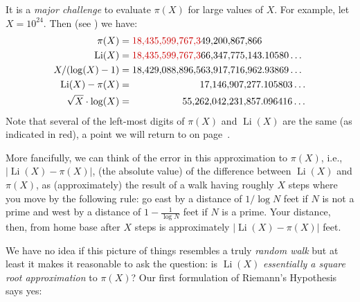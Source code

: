 \documentclass[openany]{book}
\DeclareMathOperator{\Li}{Li}
\theoremstyle{plain}
\theoremstyle{definition}
\begin{document}
It is a {\em major challenge} to
evaluate $\pi(X)$ for large values of $X$.
For example, let $X=10^{24}$.
Then \label{pili_vals} (see ) we have:
\begin{align*}
  \pi(X) &= {\color{dredcolor} 18{,}435{,}599{,}767{,}3}49{,}200{,}867{,}866\\
  \Li(X) &= {\color{dredcolor}18{,}435{,}599{,}767{,}3}66{,}347{,}775{,}143.10580\ldots \\
  X/(\log(X)-1)  &=
            18{,}429{,}088{,}896{,}563{,}917{,}716{,}962.93869\ldots\\
  \Li(X) - \pi(X) &= \hspace{7em}
     17{,}146{,}907{,}277.105803\ldots\\
  \sqrt{X}\cdot \log(X) &= \hspace{5.2em}
     55{,}262{,}042{,}231{,}857.096416 \ldots
\end{align*}
Note that several of the left-most digits of $\pi(X)$ and $\Li(X)$ are the
same (as indicated in red), a point we will return to on page~\pageref{page:leftmost}.


More fancifully, we can think of the error in this approximation to $\pi(X)$, i.e., $|\Li(X)-\pi(X)|$, (the absolute value) of the difference between $\Li(X)$ and $\pi(X)$, as (approximately) the result of  a walk having roughly $X$ steps where you move by the following rule:  go  east by a distance of $1/\log N$ feet if $N$ is not a prime and west by a distance of $1-\frac{1}{\log N}$ feet if $N$ is a prime. Your distance, then, from home base after $X$ steps is approximately $|\Li(X)-\pi(X)|$ feet.
%


We have no idea if this picture of things resembles a truly {\it random walk} but at least it makes it reasonable to ask the question: is $\Li(X)$  {\it essentially a square root approximation} to
$\pi(X)$? Our first formulation of Riemann's
Hypothesis says yes:
\end{document}
